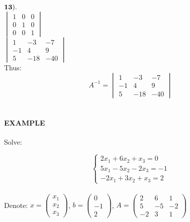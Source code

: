 \documentclass[]{article}
\let\oldparagraph\paragraph
\renewcommand{\paragraph}[1]{\oldparagraph{#1}\mbox{}}
\begin{document}
\(\bold{13).}\)\\

\(\begin{vmatrix} 1 & 0 & 0\\ 0 & 1 & 0\\ 0 & 0 & 1 \end{vmatrix}\)\\

\(\begin{vmatrix} 1 & -3 & -7\\ -1 & 4 & 9 \\ 5 & -18 & -40 \end{vmatrix}\)\\

Thus:\\

\[A^{-1}=\begin{vmatrix} 1 &   -3 &   -7\\ -1 &   4 &   9 \\ 5 &   -18 &   -40 \end{vmatrix}\]\\
 \newpage

\paragraph{\texorpdfstring{EXAMPLE\\
}{EXAMPLE }}\label{example-12}

Solve:

\[\begin{cases} 2x_1 + 6x_2 +x_3 = 0\\ 5x_1 - 5x_2 - 2x_3 = -1\\-2x_1 + 3x_2 +x_3 = 2 \end{cases}\]\\

Denote: \(x=\begin{pmatrix} x_1\\ x_2\\ x_3 \end{pmatrix}\),
\(b=\begin{pmatrix} 0\\ -1\\ 2 \end{pmatrix}\),
\(A=\begin{pmatrix} 2 & 6 & 1\\ 5 & -5 & -2 \\ -2 & 3 & 1 \end{pmatrix}\)\\
\end{document}
